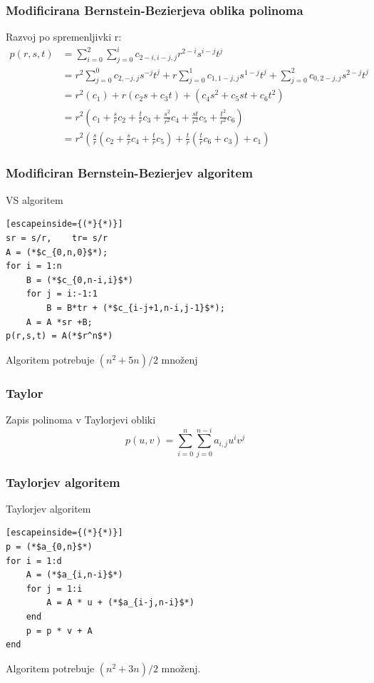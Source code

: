\documentclass{beamer}
\begin{document}
\begin{frame}
\frametitle{Modificirana Bernstein-Bezierjeva oblika polinoma}
Razvoj po spremenljivki r:
\begin{align}
p(r,s,t) &= \sum_{i=0}^{2}\sum_{j=0}^{i}c_{2-i,i-j,j}r^{2-i}s^{i-j}t^j \nonumber \\ \nonumber
&= r^2\sum_{j=0}^{0}c_{2,-j,j}s^{-j}t^j + r\sum_{j=0}^{1}c_{1,1-j,j}s^{1-j}t^j + \sum_{j=0}^{2}c_{0,2-j,j}s^{2-j}t^j \\ \nonumber
&= r^2(c_1) + r(c_2s+c_3t) + (c_4s^2+c_5st+c_6t^2)\\ \nonumber
&= r^2(c_1+\frac{s}{r}c_2+\frac{t}{r}c_3+\frac{s^2}{r^2}c_4+\frac{st}{r^2}c_5+\frac{t^2}{r^2}c_6) \\ \nonumber
&= r^2(\frac{s}{r}(c_2+\frac{s}{r}c_4+\frac{t}{r}c_5)+\frac{t}{r}(\frac{t}{r}c_6+c_3)+c_1) \nonumber
\end{align}
\end{frame}

\begin{frame}[fragile]
\frametitle{Modificiran Bernstein-Bezierjev algoritem}
\begin{block}{VS algoritem}
\begin{lstlisting}[escapeinside={(*}{*)}]
sr = s/r,	 tr= s/r
A = (*$c_{0,n,0}$*);
for i = 1:n
    B = (*$c_{0,n-i,i}$*)
    for j = i:-1:1
        B = B*tr + (*$c_{i-j+1,n-i,j-1}$*);
    A = A *sr +B;
p(r,s,t) = A(*$r^n$*)
\end{lstlisting}
\end{block}
Algoritem potrebuje $(n^2+5n)/2$ množenj


\end{frame}

\begin{frame}
\frametitle{Taylor}
Zapis polinoma v Taylorjevi obliki
$$p(u,v) = \sum_{i = 0}^n{\sum_{j=0}^{n-i}{a_{i,j}u^iv^j }}$$
\end{frame}



\begin{frame}[fragile]
\frametitle{Taylorjev algoritem}

\begin{block}{Taylorjev algoritem}
\begin{lstlisting}[escapeinside={(*}{*)}]
p = (*$a_{0,n}$*)
for i = 1:d
    A = (*$a_{i,n-i}$*)
    for j = 1:i
        A = A * u + (*$a_{i-j,n-i}$*)
    end
    p = p * v + A
end
\end{lstlisting}
\end{block}
Algoritem potrebuje $(n^2+3n)/2$ množenj.

\end{frame}
\end{document}
